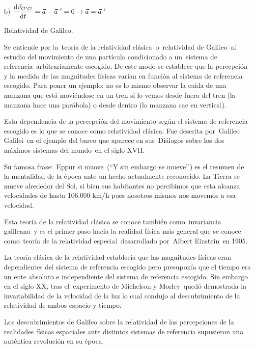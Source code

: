 b) $\displaystyle \dv{\vec v_{\mathcal O' \mathcal O}}{t}=\vec a -\vec a \ '=0 \to \vec a=\vec a \ '$

\newpage %
\begin{myblock}{Relatividad de Galileo.}
\begin{small}
\vspace{2mm} Se entiende por la teoría de la relatividad clásica o relatividad de Galileo al estudio del movimiento de una partícula condicionado a un sistema de referencia arbitrariamente escogido. De este modo se establece que la percepción y la medida de las magnitudes físicas varían en función al sistema de referencia escogido. Para poner un ejemplo: no es lo mismo observar la caída de una manzana que está moviéndose en un tren si lo vemos desde fuera del tren (la manzana hace una parábola) o desde dentro (la manzana cae en vertical).

\vspace{2mm} Esta dependencia de la percepción del movimiento según el sistema de referencia escogido es lo que se conoce como relatividad clásica. Fue descrita por Galileo Galilei en el ejemplo del barco que aparece en sus Diálogos sobre los dos máximos sistemas del mundo en el siglo XVII.

\vspace{2mm} Su famosa frase: Eppur si muove (``Y sin embargo se mueve’’) es el resumen de la mentalidad de la época ante un hecho actualmente reconocido. La Tierra se mueve alrededor del Sol, si bien sus habitantes no percibimos que esta alcanza velocidades de hasta 106.000 km/h pues nosotros mismos nos movemos a esa velocidad. 

\vspace{2mm} Esta teoría de la relatividad clásica se conoce también como invariancia galileana y es el primer paso hacia la realidad física más general que se conoce como teoría de la relatividad especial desarrollado por Albert Einstein en 1905.

\vspace{2mm} La teoría clásica de la relatividad establecía que las magnitudes físicas eran dependientes del sistema de referencia escogido pero presuponía que el tiempo era un ente absoluto e independiente del sistema de referencia escogido. Sin embargo en el siglo XX, tras el experimento de Michelson y Morley quedó demostrada la invariabilidad de la velocidad de la luz lo cual condujo al descubrimiento de la relatividad de ambos espacio y tiempo.

\vspace{2mm} Los descubrimientos de Galileo sobre la relatividad de las percepciones de la realidades físicas espaciales ante distintos sistemas de referencia supusieron una auténtica revolución en su época.	
\end{small}
\end{myblock}
